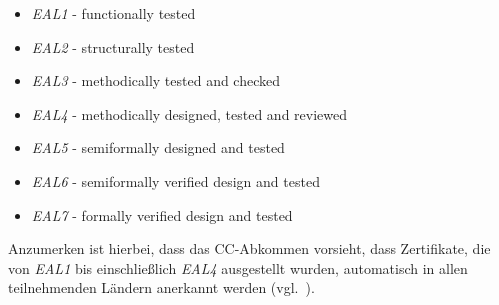 \begin{itemize}
\itemsep0.5em
\item \textit{EAL1} - functionally tested
\item \textit{EAL2} - structurally tested
\item \textit{EAL3} - methodically tested and checked
\item \textit{EAL4} - methodically designed, tested and reviewed
\item \textit{EAL5} - semiformally designed and tested
\item \textit{EAL6} - semiformally verified design and tested
\item \textit{EAL7} - formally verified design and tested
\end{itemize}

\noindent
Anzumerken ist hierbei, dass das CC-Abkommen vorsieht, dass Zertifikate, die von \textit{EAL1} bis einschließlich \textit{EAL4} ausgestellt wurden, automatisch in allen teilnehmenden Ländern anerkannt werden (vgl.~\cite[96]{ITS2}).
